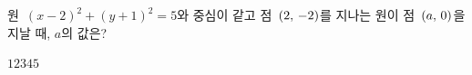 원~$(x-2)^2+(y+1)^2=5$와 중심이 같고 점~$(2,\mkern3mu -2)$를 지나는 원이 점~$(a,\mkern3mu 0)$을 지날 때, $a$의 값은?
\begin{choices32}{$1$}{$2$}{$3$}{$4$}{$5$}\end{choices32}
